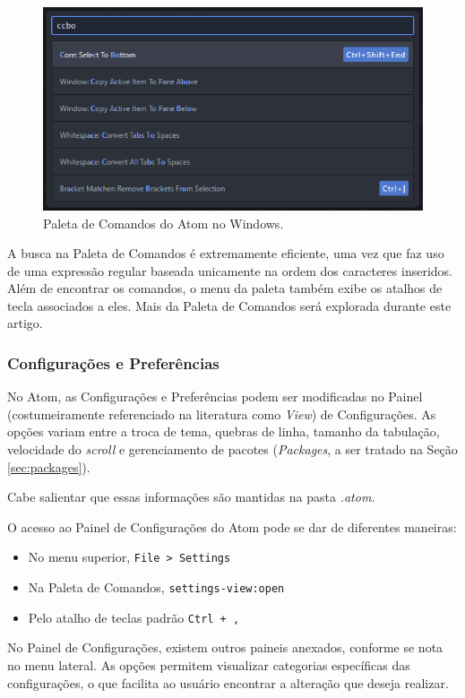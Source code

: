	\begin{figure}[h]
		\centering
		\label{fig:paleta}
		\includegraphics[scale = 0.7]{paleta}
		\caption{Paleta de Comandos do Atom no Windows.}
	\end{figure}

	A busca na Paleta de Comandos é extremamente eficiente, uma vez que faz uso de uma expressão regular baseada unicamente na ordem dos caracteres inseridos. Além de encontrar os comandos, o menu da paleta também exibe os atalhos de tecla associados a eles. Mais da Paleta de Comandos será explorada durante este artigo.

	\subsubsection{Configurações e Preferências}
	No Atom, as Configurações e Preferências podem ser modificadas no Painel (costumeiramente referenciado na literatura como \textit{View}) de Configurações. As opções variam entre a troca de tema, quebras de linha, tamanho da tabulação, velocidade do \textit{scroll} e gerenciamento de pacotes (\textit{Packages}, a ser tratado na Seção \ref{sec:packages}).

	Cabe salientar que essas informações são mantidas na pasta \textit{.atom}.

	O acesso ao Painel de Configurações do Atom pode se dar de diferentes maneiras:
	\begin{itemize}
		\item No menu superior, \verb|File > Settings|
		\item Na Paleta de Comandos, \verb|settings-view:open|
		\item Pelo atalho de teclas padrão \verb|Ctrl + ,|
	\end{itemize}

	No Painel de Configurações, existem outros paineis anexados, conforme se nota no menu lateral. As opções permitem visualizar categorias específicas das configurações, o que facilita ao usuário encontrar a alteração que deseja realizar.

